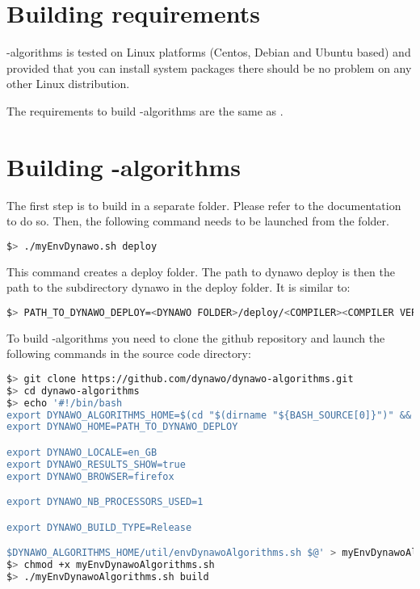 \documentclass[a4paper, 12pt]{report}
\begin{document}
\section{Building requirements}

\Dynawo-algorithms is tested on Linux platforms (Centos, Debian and Ubuntu based) and provided that you can install system packages there should be no problem on any other Linux distribution. 

The requirements to build \Dynawo-algorithms are the same as \Dynawo.

\section[Building Dynawo-algorithms]{Building \Dynawo-algorithms}
\label{Dynawo_algorithms_Installation_Documentation_Building_Dynawo_algorithm}
The first step is to build \Dynawo in a separate folder. Please refer to the \Dynawo documentation to do so.
Then, the following command needs to be launched from the \Dynawo folder.

\begin{lstlisting}[language=bash]
$> ./myEnvDynawo.sh deploy
\end{lstlisting}

This command creates a deploy folder. The path to dynawo deploy is then the path to the subdirectory dynawo in the deploy folder. It is similar to:

\begin{lstlisting}[language=bash]
$> PATH_TO_DYNAWO_DEPLOY=<DYNAWO FOLDER>/deploy/<COMPILER><COMPILER VERSION>/shared/dynawo/
\end{lstlisting}

To build \Dynawo-algorithms you need to clone the github repository and launch the following commands in the source code directory:

\begin{lstlisting}[language=bash]
$> git clone https://github.com/dynawo/dynawo-algorithms.git
$> cd dynawo-algorithms
$> echo '#!/bin/bash
export DYNAWO_ALGORITHMS_HOME=$(cd "$(dirname "${BASH_SOURCE[0]}")" && pwd)
export DYNAWO_HOME=PATH_TO_DYNAWO_DEPLOY

export DYNAWO_LOCALE=en_GB
export DYNAWO_RESULTS_SHOW=true
export DYNAWO_BROWSER=firefox

export DYNAWO_NB_PROCESSORS_USED=1

export DYNAWO_BUILD_TYPE=Release

$DYNAWO_ALGORITHMS_HOME/util/envDynawoAlgorithms.sh $@' > myEnvDynawoAlgorithms.sh
$> chmod +x myEnvDynawoAlgorithms.sh
$> ./myEnvDynawoAlgorithms.sh build
\end{lstlisting}
\end{document}
